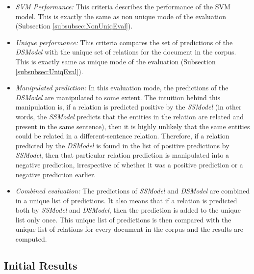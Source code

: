 \begin{itemize}

\item \textit{SVM Performance:} This criteria describes the performance of the SVM model. This is exactly the same as non unique mode of the evaluation (Subsection \ref{subsubsec:NonUniqEval}).

\item \textit{Unique performance:} This criteria compares the set of predictions of the \textit{DSModel} with the unique set of relations for the document in the corpus. This is exactly same as unique mode of the evaluation (Subsection \ref{subsubsec:UniqEval}).

\item \textit{Manipulated prediction:} In this evaluation mode, the predictions of the \textit{DSModel} are manipulated to some extent. The intuition behind this manipulation is, if a relation is predicted positive by the \textit{SSModel} (in other words, the \textit{SSModel} predicts that the entities in the relation are related and present in the same sentence), then it is highly unlikely that the same entities could be related in a different-sentence relation. Therefore, if a relation predicted by the \textit{DSModel} is found in the list of positive predictions by \textit{SSModel}, then that particular relation prediction is manipulated into a negative prediction, irrespective of whether it was a positive prediction or a negative prediction earlier. 

\item \textit{Combined evaluation:} The predictions of \textit{SSModel} and \textit{DSModel} are combined in a unique list of predictions. It also means that if a relation is predicted both by \textit{SSModel} and \textit{DSModel}, then the prediction is added to the unique list only once. This unique list of predictions is then compared with the unique list of relations for every document in the corpus and the results are computed. 

\end{itemize}

\subsection{Initial Results}

